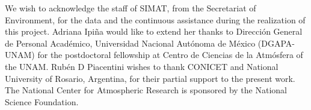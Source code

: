 \documentclass[journal=jacsat,manuscript=article]{achemso}
\begin{document}
\begin{acknowledgement}
  We wish to acknowledge the staff of SIMAT, from the Secretariat of
  Environment, for the data and the continuous assistance during the
  realization of this project. Adriana Ipiña would like to extend her
  thanks to Dirección General de Personal Académico, Universidad
  Nacional Autónoma de México (DGAPA-UNAM) for the postdoctoral fellowship
  at Centro de Ciencias de la Atmósfera of the UNAM. Rubén D Piacentini
  wishes to thank CONICET and National University of Rosario, Argentina,
  for their partial support to the present work. The National Center for
  Atmospheric Research is sponsored by the National Science Foundation.
\end{acknowledgement}










\end{document}
